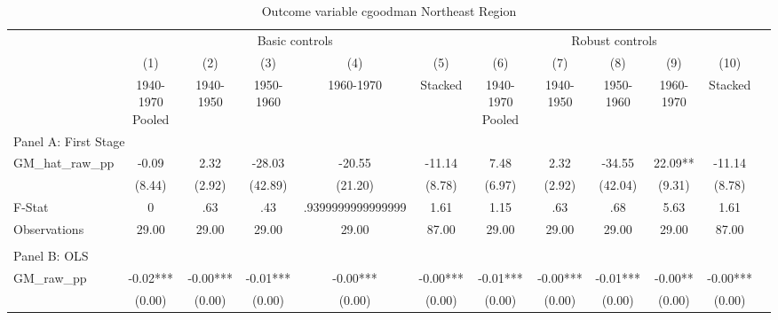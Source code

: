  \begin{table}[htbp]\centering {} \begin{threeparttable} \caption{Outcome variable cgoodman Northeast Region} \begin{tabular}{l*{11}{c}} \toprule
          &\multicolumn{5}{c}{Basic controls}                                   &\multicolumn{5}{c}{Robust controls}                                  \\\cmidrule(lr){2-6}\cmidrule(lr){7-11}
          &\multicolumn{1}{c}{(1)}&\multicolumn{1}{c}{(2)}&\multicolumn{1}{c}{(3)}&\multicolumn{1}{c}{(4)}&\multicolumn{1}{c}{(5)}&\multicolumn{1}{c}{(6)}&\multicolumn{1}{c}{(7)}&\multicolumn{1}{c}{(8)}&\multicolumn{1}{c}{(9)}&\multicolumn{1}{c}{(10)}\\
          &\multicolumn{1}{c}{1940-1970 Pooled}&\multicolumn{1}{c}{1940-1950}&\multicolumn{1}{c}{1950-1960}&\multicolumn{1}{c}{1960-1970}&\multicolumn{1}{c}{Stacked}&\multicolumn{1}{c}{1940-1970 Pooled}&\multicolumn{1}{c}{1940-1950}&\multicolumn{1}{c}{1950-1960}&\multicolumn{1}{c}{1960-1970}&\multicolumn{1}{c}{Stacked}\\
\cmidrule(lr){1-11}
\multicolumn{10}{l}{Panel A: First Stage}\\
\cmidrule(lr){1-11}
GM\_hat\_raw\_pp&     -0.09   &      2.32   &    -28.03   &    -20.55   &    -11.14   &      7.48   &      2.32   &    -34.55   &     22.09** &    -11.14   \\
          &    (8.44)   &    (2.92)   &   (42.89)   &   (21.20)   &    (8.78)   &    (6.97)   &    (2.92)   &   (42.04)   &    (9.31)   &    (8.78)   \\
\midrule
F-Stat    &         0   &       .63   &       .43   &.9399999999999999   &      1.61   &      1.15   &       .63   &       .68   &      5.63   &      1.61   \\
Observations&     29.00   &     29.00   &     29.00   &     29.00   &     87.00   &     29.00   &     29.00   &     29.00   &     29.00   &     87.00   \\
\cmidrule[\heavyrulewidth](lr){1-11} \\ \cmidrule[\heavyrulewidth](lr){1-11}
\multicolumn{10}{l}{Panel B: OLS}\\
\cmidrule(lr){1-11}
GM\_raw\_pp &     -0.02***&     -0.00***&     -0.01***&     -0.00***&     -0.00***&     -0.01***&     -0.00***&     -0.01***&     -0.00** &     -0.00***\\
          &    (0.00)   &    (0.00)   &    (0.00)   &    (0.00)   &    (0.00)   &    (0.00)   &    (0.00)   &    (0.00)   &    (0.00)   &    (0.00)   \\

\end{tabular}
\end{threeparttable}
\end{table}
